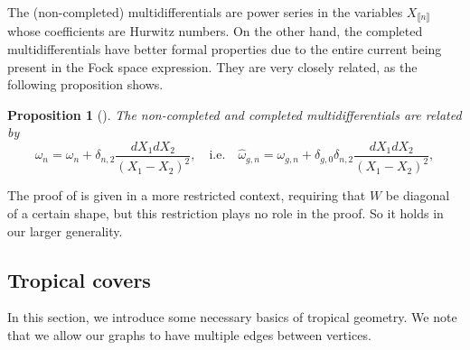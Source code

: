 \documentclass[10pt,a4paper,oneside,no-math,reqno]{amsart}%
\theoremstyle{plain}
\newtheorem{proposition}[theorem]{Proposition}
\theoremstyle{definition}
\theoremstyle{remark}
\numberwithin{equation}{section}
\newcommand{\1}{\mathds{1}}
\newcommand{\<}{\langle}
\renewcommand{\>}{\rangle}
\begin{document}
The (non-completed) multidifferentials are power series in the variables $ X_{\llbracket n \rrbracket}$ whose coefficients are Hurwitz numbers. On the other hand, the completed multidifferentials have better formal properties due to the entire current being present in the Fock space expression. They are very closely related, as the following proposition shows.

\begin{proposition}[{\cite[Proposition 4.1]{BDKS22}}]
    The non-completed and completed multidifferentials are related by
    \begin{equation}
        \widehat{\omega}_n
        =
        \omega_n + \delta_{n,2} \frac{dX_1 dX_2}{(X_1 - X_2)^2} ,
        \quad
        \text{i.e.}
        \quad
        \widehat{\omega}_{g,n}
        =
        \omega_{g,n} + \delta_{g,0} \delta_{n,2} \frac{dX_1 dX_2}{(X_1 - X_2)^2} ,
    \end{equation}
\end{proposition}

The proof of \cite[Proposition 4.1]{BDKS22} is given in a more restricted context, requiring that $W$ be diagonal of a certain shape, but this restriction plays no role in the proof. So it holds in our larger generality.



\subsection{Tropical covers}
\label{sec-tropcov}

In this section, we introduce some necessary basics of tropical geometry.
We note that we allow our graphs to have multiple edges between vertices.
\end{document}
